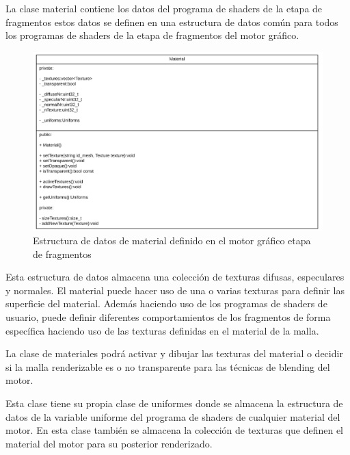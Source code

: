 \documentclass[a4paper, 17pt]{book}
\begin{document}
La clase material contiene los datos del  programa de shaders de la etapa de fragmentos estos datos se definen en una estructura de
datos común para todos los programas de shaders de la etapa de fragmentos del motor gráfico.

\begin{figure}[H]
    \centering
    \includegraphics[scale=0.25, keepaspectratio]{img/Material.png}
    \caption{Estructura de datos de material definido en el motor gráfico etapa de fragmentos}
    \label{figura:Material}
\end{figure}

Esta estructura de datos almacena una colección de texturas difusas, especulares y normales. El material puede hacer uso de una o
varias texturas para definir las superficie del material. Además haciendo uso de los programas de shaders de usuario, puede definir
diferentes comportamientos de los fragmentos de forma específica haciendo uso de las texturas definidas en el material de la malla.

\vspace{1mm} %

La clase de materiales podrá activar y dibujar las texturas del material o decidir si la malla renderizable es o no transparente para
las técnicas de blending del motor. 

\vspace{1mm} %

Esta clase tiene su propia clase de uniformes donde se almacena la estructura de datos de la variable uniforme del programa de shaders
de cualquier material del motor. En esta clase también se almacena la colección de texturas que definen el material del motor para
su posterior renderizado.
\end{document}
